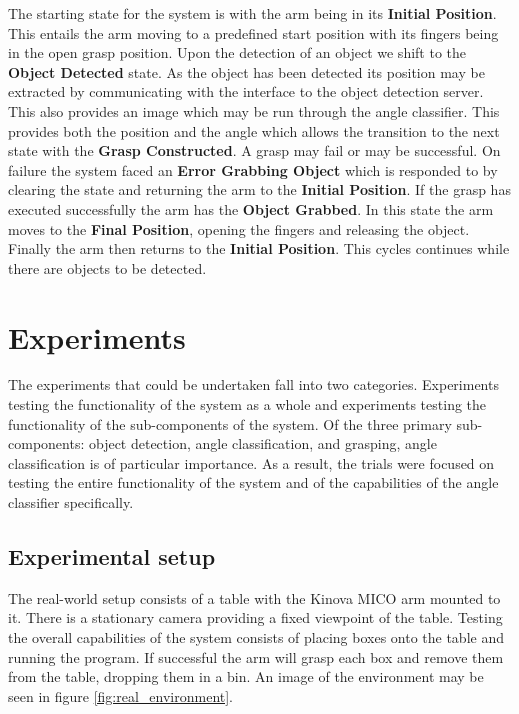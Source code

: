 \documentclass[letterpaper, 10 pt, conference]{conf/ieeeconf}  %
\begin{document}
The starting state for the system is with the arm being in its \textbf{Initial
  Position}. This entails the arm moving to a predefined start position with its
fingers being in the open grasp position. Upon the detection of an object we
shift to the \textbf{Object Detected} state. As the object has been detected its
position may be extracted by communicating with the interface to the object
detection server. This also provides an image which may be run through the angle
classifier. This provides both the position and the angle which allows the
transition to the next state with the \textbf{Grasp Constructed}. A grasp may
fail or may be successful. On failure the system faced an \textbf{Error Grabbing
  Object} which is responded to by clearing the state and returning the arm to the
\textbf{Initial Position}. If the grasp has executed successfully the arm has
the \textbf{Object Grabbed}. In this state the arm moves to the \textbf{Final
  Position}, opening the fingers and releasing the object. Finally the arm then
returns to the \textbf{Initial Position}. This cycles continues while there are
objects to be detected.


\section{Experiments}
\label{sec:experiments}
The experiments that could be undertaken fall into two categories. Experiments
testing the functionality of the system as a whole and experiments testing the
functionality of the sub-components of the system. Of the three primary
sub-components: object detection, angle classification, and grasping, angle
classification is of particular importance. As a result, the trials were focused
on testing the entire functionality of the system and of the capabilities of the
angle classifier specifically.

\subsection{Experimental setup}
The real-world setup consists of a table with the Kinova MICO arm mounted to it.
There is a stationary camera providing a fixed viewpoint of the table. Testing
the overall capabilities of the system consists of placing boxes onto the table
and running the program. If successful the arm will grasp each box and remove
them from the table, dropping them in a bin. An image of the environment may
be seen in figure \ref{fig:real_environment}.
\end{document}
